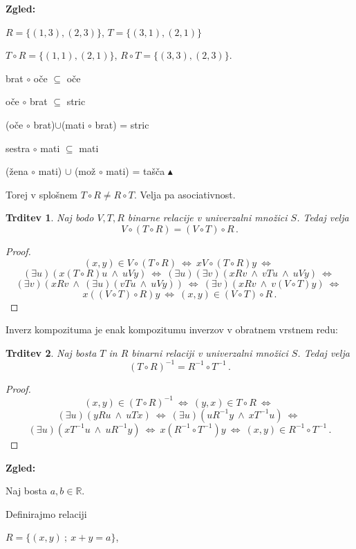 \documentclass[11pt,paper=b5,footinclude,headinclude]{scrbook} %
\def\inn {{~\wedge~}}
\def\cee {{~\Leftrightarrow~}}
\def\zgled{\noindent\textbf{\color{blue} Zgled: }}
\def\kz{{\hfill{\color{blue}$\blacktriangle$}}}%
\newtheorem*{trditev}{Trditev}
\begin{document}
\bigskip
\zgled

$R = \{(1,3),(2,3)\}$, $T = \{(3,1), (2,1)\}$

$T\circ R = \{(1,1), (2,1)\}$, $R\circ T = \{(3,3),(2,3)\}$.

\medskip

brat $\circ$ oče $\subseteq$ oče

oče  $\circ$ brat $\subseteq$ stric

(oče $\circ$ brat)$\cup$(mati $\circ$ brat) = stric

sestra $\circ$ mati $\subseteq$  mati

(žena $\circ$ mati) $\cup$ (mož $\circ$ mati) = tašča
\kz

\medskip
Torej v splošnem $T\circ R\neq R\circ T$. Velja pa asociativnost.


\begin{trditev}
Naj bodo $V, T, R$ binarne relacije v univerzalni množici $S$. Tedaj velja
$$V\circ(T\circ R) = (V\circ T)\circ R\,.$$
\end{trditev}

\begin{proof}
$$(x,y)\in V\circ(T\circ R)\cee x V\circ(T\circ R) y
\cee$$
$$(\exists u)(x(T\circ R)u\inn uVy)
\cee (\exists u)(\exists v)(xRv\inn vTu\inn uVy)\cee $$
$$(\exists v)(xRv\inn (\exists u)(vTu\inn uVy))
\cee(\exists v)(xRv\inn v(V\circ T)y)\cee$$
$$x ((V\circ T)\circ R)y \cee (x,y)\in (V\circ T)\circ R\,.$$
\end{proof}

Inverz kompozituma je enak kompozitumu inverzov v obratnem vrstnem redu:

\begin{trditev}
Naj bosta $T$ in $R$ binarni relaciji v univerzalni množici $S$. Tedaj velja
$$(T\circ R)^{-1} = R^{-1}\circ T^{-1}\,.$$
\end{trditev}

\begin{proof}
$$(x,y)\in (T\circ R)^{-1} \cee (y,x)\in T\circ R
\cee$$
$$(\exists u)(yRu\inn uTx)
\cee (\exists u)(uR^{-1}y\inn xT^{-1}u)
\cee$$
$$(\exists u)(xT^{-1}u\inn uR^{-1}y)
\cee x (R^{-1}\circ T^{-1}) y\cee (x,y)\in R^{-1}\circ T^{-1}\,.$$
\end{proof}


\bigskip
\zgled

Naj bosta $a,b\in\mathbb{R}$.

Definirajmo relaciji

$R = \{(x,y)~;~x+y = a\}$,
\end{document}
